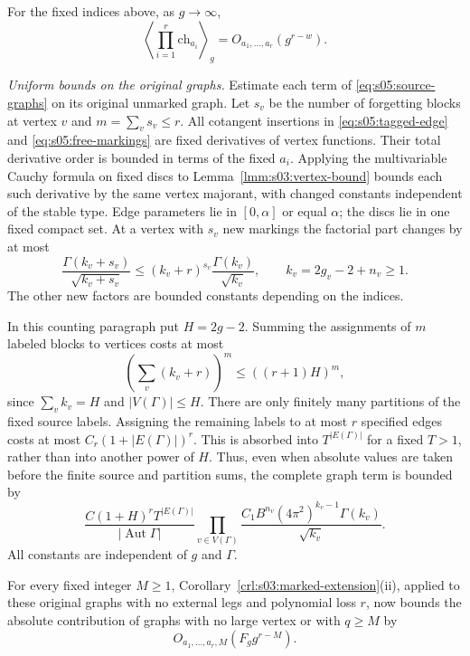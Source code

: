 \begin{lmm}\label{lmm:s05:character-filtration}
For the fixed indices above, as $g\to\infty$,
\begin{equation}\label{eq:s05:character-bound}
 \left\langle\prod_{i=1}^r\mathrm{ch}_{a_i}\right\rangle_g
       =O_{a_1,\ldots,a_r}(g^{r-w}).
\end{equation}
\end{lmm}
\begin{prf}
\emph{Uniform bounds on the original graphs.}
Estimate each term of \eqref{eq:s05:source-graphs} on its original
unmarked graph.
Let $s_v$ be the number of forgetting blocks at vertex $v$ and
$m=\sum_v s_v\leq r$. All cotangent insertions in
\eqref{eq:s05:tagged-edge} and \eqref{eq:s05:free-markings} are
fixed derivatives of vertex functions. Their total derivative order
is bounded in terms of the fixed $a_i$. Applying the multivariable
Cauchy formula on fixed discs to
Lemma~\ref{lmm:s03:vertex-bound} bounds each such derivative by the
same vertex majorant, with changed constants independent of the
stable type. Edge parameters lie in $[0,\alpha]$ or equal $\alpha$;
the discs lie in one fixed compact set. At a vertex with $s_v$ new
markings the factorial part changes by at most
\[
 \frac{\Gamma(k_v+s_v)}{\sqrt{k_v+s_v}}
 \leq(k_v+r)^{s_v}\frac{\Gamma(k_v)}{\sqrt{k_v}},
 \qquad k_v=2g_v-2+n_v\geq1.
\]
The other new factors are bounded constants depending on the indices.

In this counting paragraph put $H=2g-2$. Summing the assignments of
$m$ labeled blocks to vertices costs at most
\[
 \left(\sum_v(k_v+r)\right)^m
 \leq((r+1)H)^m,
\]
since $\sum_v k_v=H$ and $|V(\Gamma)|\leq H$.
There are only finitely many partitions of the fixed source labels.
Assigning the remaining labels to at most $r$ specified edges costs
at most $C_r(1+|E(\Gamma)|)^r$. This is absorbed into
$T^{|E(\Gamma)|}$ for a fixed $T>1$, rather than into another power
of $H$. Thus, even when absolute values are taken before the finite
source and partition sums, the complete graph term is bounded by
\begin{equation}\label{eq:s05:source-majorant}
 \frac{C(1+H)^rT^{|E(\Gamma)|}}{|\operatorname{Aut}\Gamma|}
 \prod_{v\in V(\Gamma)}
 \frac{C_1B^{n_v}(4\pi^2)^{k_v-1}\Gamma(k_v)}{\sqrt{k_v}}.
\end{equation}
All constants are independent of $g$ and $\Gamma$.

For every fixed integer $M\geq1$,
Corollary~\ref{crl:s03:marked-extension}\textup{(ii)}, applied to
these original graphs with no external legs and polynomial loss $r$,
now bounds the absolute contribution of graphs with no large vertex
or with $q\geq M$ by
\begin{equation}\label{eq:s05:source-tail}
 O_{a_1,\ldots,a_r,M}(F_g g^{r-M}).
\end{equation}


\end{prf}

